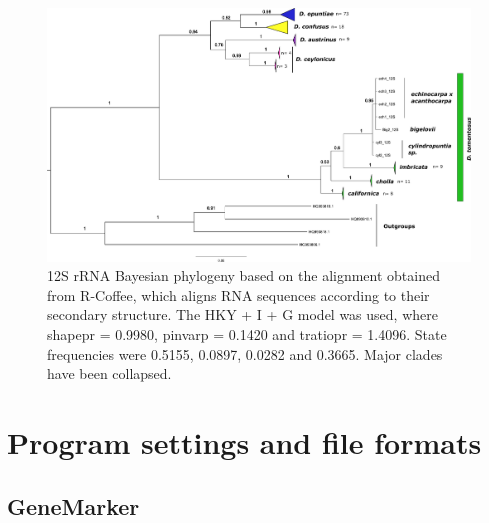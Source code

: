 \begin{landscape}
\label{sec:tcoffee}

\begin{figure}[H]
	\centering
	\includegraphics[scale =0.7]{Images/12S_rcoffee_collapsed_export.pdf}
	\caption{12S rRNA Bayesian phylogeny based on the alignment obtained from R-Coffee, which aligns RNA sequences according to their secondary structure. The HKY + I + G model was used, where shapepr = 0.9980, pinvarp = 0.1420 and tratiopr = 1.4096. State frequencies were 0.5155, 0.0897, 0.0282 and 0.3665. Major clades have been collapsed.}  
	\label{fig:12S_rcoffee}
\end{figure}

\end{landscape}

\section{Program settings and file formats}
\subsection{GeneMarker}
\label{appendix:genemarker_settings}

